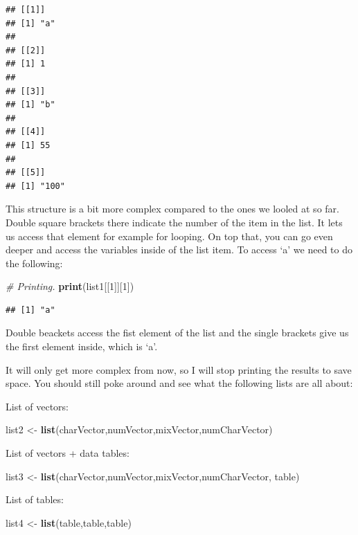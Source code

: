 \documentclass[]{book}
\newenvironment{Shaded}{\begin{snugshade}}{\end{snugshade}}
\newcommand{\CommentTok}[1]{\textcolor[rgb]{0.56,0.35,0.01}{\textit{#1}}}
\newcommand{\DecValTok}[1]{\textcolor[rgb]{0.00,0.00,0.81}{#1}}
\newcommand{\KeywordTok}[1]{\textcolor[rgb]{0.13,0.29,0.53}{\textbf{#1}}}
\newcommand{\NormalTok}[1]{#1}
\newcommand{\StringTok}[1]{\textcolor[rgb]{0.31,0.60,0.02}{#1}}
\begin{document}
\begin{verbatim}
## [[1]]
## [1] "a"
## 
## [[2]]
## [1] 1
## 
## [[3]]
## [1] "b"
## 
## [[4]]
## [1] 55
## 
## [[5]]
## [1] "100"
\end{verbatim}

This structure is a bit more complex compared to the ones we looled at so far. Double square brackets there indicate the number of the item in the list. It lets us access that element for example for looping. On top that, you can go even deeper and access the variables inside of the list item. To access `a' we need to do the following:

\begin{Shaded}
\begin{Highlighting}[]
\CommentTok{# Printing.}
\KeywordTok{print}\NormalTok{(list1[[}\DecValTok{1}\NormalTok{]][}\DecValTok{1}\NormalTok{]) }
\end{Highlighting}
\end{Shaded}

\begin{verbatim}
## [1] "a"
\end{verbatim}

Double beackets access the fist element of the list and the single brackets give us the first element inside, which is `a'.

It will only get more complex from now, so I will stop printing the results to save space. You should still poke around and see what the following lists are all about:

List of vectors:

\begin{Shaded}
\begin{Highlighting}[]
\NormalTok{list2 <-}\StringTok{ }\KeywordTok{list}\NormalTok{(charVector,numVector,mixVector,numCharVector)}
\end{Highlighting}
\end{Shaded}

List of vectors + data tables:

\begin{Shaded}
\begin{Highlighting}[]
\NormalTok{list3 <-}\StringTok{ }\KeywordTok{list}\NormalTok{(charVector,numVector,mixVector,numCharVector, table)}
\end{Highlighting}
\end{Shaded}

List of tables:

\begin{Shaded}
\begin{Highlighting}[]
\NormalTok{list4 <-}\StringTok{ }\KeywordTok{list}\NormalTok{(table,table,table)}
\end{Highlighting}
\end{Shaded}
\end{document}
